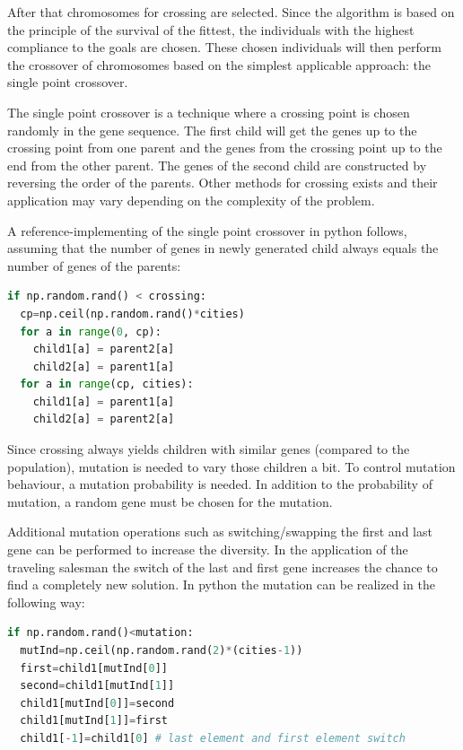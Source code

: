 \documentclass[11pt,a4paper]{article}
\begin{document}
After that chromosomes for crossing are selected. Since the algorithm is based on the principle of the survival of the fittest, the individuals with the highest compliance to the goals are chosen. These chosen individuals will then perform the crossover of chromosomes based on the simplest applicable approach: the single point crossover.

The single point crossover is a technique where a crossing point is chosen randomly in the gene sequence. The first child will get the genes up to the crossing point from one parent and the genes from the crossing point up to the end from the other parent. The genes of the second child are constructed by reversing the order of the parents. Other methods for crossing exists and their application may vary depending on the complexity of the problem. 

A reference-implementing of the single point crossover in python follows, assuming that the number of genes in newly generated child always equals the number of genes of the parents:\\
\begin{lstlisting}[language=Python]
if np.random.rand() < crossing:
  cp=np.ceil(np.random.rand()*cities)
  for a in range(0, cp):
    child1[a] = parent2[a]
    child2[a] = parent1[a]
  for a in range(cp, cities):
    child1[a] = parent1[a]
    child2[a] = parent2[a]
\end{lstlisting}

Since crossing always yields children with similar genes (compared to the population), mutation is needed to vary those children a bit. To control mutation behaviour, a mutation probability is needed. In addition to the probability of mutation, a random gene must be chosen for the mutation.

Additional mutation operations such as switching/swapping the first and last gene can be performed to increase the diversity. In the application of the traveling salesman the switch of the last and first gene increases the chance to find a completely new solution. In python the mutation can be realized in the following way:\\

\begin{lstlisting}[language=Python]
if np.random.rand()<mutation:
  mutInd=np.ceil(np.random.rand(2)*(cities-1))
  first=child1[mutInd[0]]
  second=child1[mutInd[1]]
  child1[mutInd[0]]=second
  child1[mutInd[1]]=first
  child1[-1]=child1[0] # last element and first element switch
\end{lstlisting}
\end{document}
